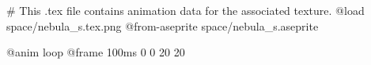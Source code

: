 # This .tex file contains animation data for the associated texture.
@load space/nebula_s.tex.png
@from-aseprite space/nebula_s.aseprite

@anim loop
	@frame 100ms 0 0 20 20
